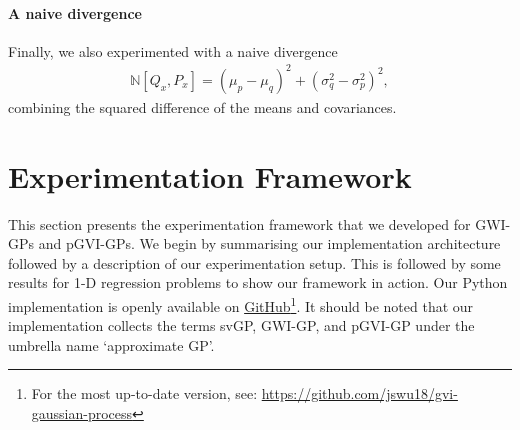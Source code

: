 \documentclass{article}
\numberwithin{equation}{section}
\begin{document}
\paragraph{A naive divergence}Finally, we also experimented with a naive divergence
\begin{align}
    \mathbb{N} \left[Q_{x}, P_{x}\right] = \left(\mu_p - \mu_q\right)^2 + \left(\sigma_q^2-\sigma_p^2\right)^2,
\end{align}
combining the squared difference of the means and covariances.

\newpage
\section{Experimentation Framework}\label{section:experimentation-framework}
This section presents the experimentation framework that we developed for GWI-GPs and pGVI-GPs.
We begin by summarising our implementation architecture followed by a description of our experimentation setup.
This is followed by some results for 1-D regression problems to show our framework in action.
Our Python implementation is openly available on \href{https://github.com/jswu18/gvi-gaussian-process}{GitHub}\footnote{For the most up-to-date version, see: \href{https://github.com/jswu18/gvi-gaussian-process}{https://github.com/jswu18/gvi-gaussian-process}}. 
It should be noted that our implementation collects the terms svGP, GWI-GP, and pGVI-GP under the umbrella name `approximate GP'.
\end{document}
